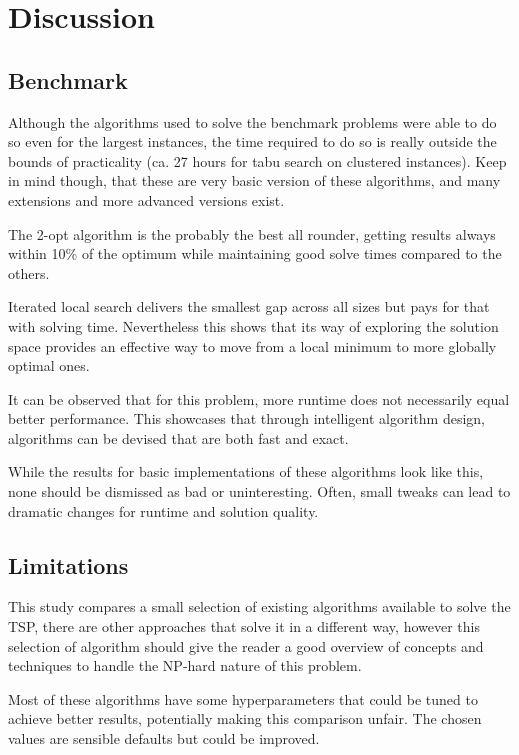\section{Discussion}




\subsection{Benchmark}

Although the algorithms used to solve the benchmark problems were able to do so even for the largest instances, the time required to do so is really outside the bounds of practicality (ca. 27 hours for tabu search on clustered instances). Keep in mind though, that these are very basic version of these algorithms, and many extensions and more advanced versions exist.

The 2-opt algorithm is the probably the best all rounder, getting results always within 10\% of the optimum while maintaining good solve times compared to the others.

Iterated local search delivers the smallest gap across all sizes but pays for that with solving time. Nevertheless this shows that its way of exploring the solution space provides an effective way to move from a local minimum to more globally optimal ones.

It can be observed that for this problem, more runtime does not necessarily equal better performance. This showcases that through intelligent algorithm design, algorithms can be devised that are both fast and exact.

While the results for basic implementations of these algorithms look like this, none should be dismissed as bad or uninteresting.
Often, small tweaks can lead to dramatic changes for runtime and solution quality.


\subsection{Limitations}
This study compares a small selection of existing algorithms available to solve the TSP, there are other approaches that solve it in a different way, however this selection of algorithm should give the reader a good overview of concepts and techniques to handle the NP-hard nature of this problem.

Most of these algorithms have some hyperparameters that could be tuned to achieve better results, potentially making this comparison unfair. The chosen values are sensible defaults but could be improved.

